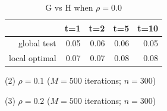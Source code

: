 \documentclass[12pt]{report}
\begin{document}
\begin{table}[ht]
\centering
\begin{tabular}{rrrrr}
  \hline
 & t=1 & t=2 & t=5 & t=10 \\ 
  \hline
global test & 0.05 & 0.06 & 0.06 & 0.05 \\ 
  local optimal & 0.07 & 0.07 & 0.08 & 0.08 \\ 
   \hline
\end{tabular}
\caption{G vs H when $\rho = 0.0$}
\end{table}


(2) $\rho = 0.1$ ($M = 500$ iterations; $n = 300$)

(3) $\rho = 0.2$ ($M = 500$ iterations; $n = 300$)



\begin{figure}[H]
\captionsetup{format=plain}
\centering
{}

\end{figure}
\end{document}

